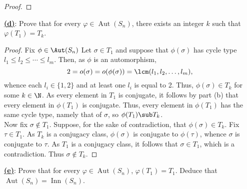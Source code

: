 \documentclass[12pt]{article}
\begin{document}
\begin{homeworkProblem}
\begin{proof}
  \end{proof}

  \underline{\textbf{(d)}}: Prove that for every $\varphi \in \operatorname{Aut}(S_n)$, there exists an integer $k$ such that $\varphi(T_1) = T_k$.

  \begin{proof}
    Fix $ \phi\in \Aut(S_{n}) $ Let $ \sigma\in T_{1}$ and suppose that $ \phi(\sigma) $ has cycle type $ l_{1}\leq l_{2}\leq \cdots\leq l_{m} $. Then, as $ \phi $ is an automorphism, 
    \[
      2 = o(\sigma) = o(\phi(\sigma)) = \lcm(l_{1},l_{2},\ldots, l_{m}),
    \]
    whence each $ l_{i}\in \{1,2\} $ and at least one $ l_{i} $ is equal to 2. Thus, $ \phi(\sigma)\in T_{k} $ for some $ k\in \N $. As every element in $ T_{1} $  is conjugate, it follows by part (b) that every element in $ \phi(T_{1}) $  is conjugate. Thus, every element in $ \phi(T_{1}) $ has the same cycle type, namely that of $ \sigma $, so $ \phi(T_{1})\sub T_{k} $.\\

    Now fix $ \sigma\not \in T_{1} $. Suppose, for the sake of contradiction, that $ \phi(\sigma)\in T_{k} $. Fix $ \tau\in T_{1} $. As $ T_{k} $ is a conjugacy class, $ \phi(\sigma) $ is conjugate to $ \phi(\tau) $, whence $ \sigma $ is conjugate to $ \tau $. As $ T_{1} $ is a conjugacy class, it follows that $ \sigma\in T_{1} $, which is a contradiction. Thus $ \sigma\not \in T_{k} $.

  \end{proof}

  \underline{\textbf{(e)}}: Prove that for every $\varphi \in \operatorname{Aut}(S_n)$, $\varphi(T_1) = T_1$.  
  Deduce that $\operatorname{Aut}(S_n) = \operatorname{Inn}(S_n)$.


\end{homeworkProblem}
\end{document}
